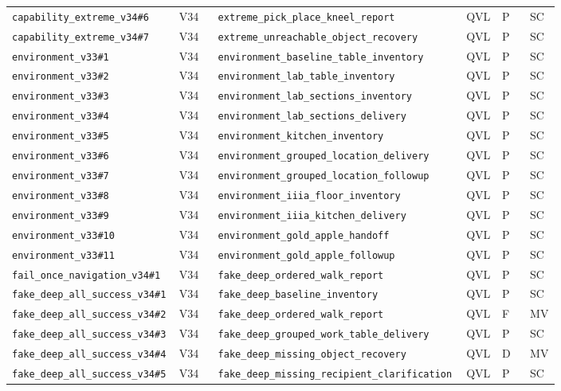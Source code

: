 \begin{landscape}
\begin{longtable}{@{}p{0.205\linewidth}p{0.075\linewidth}p{0.35\linewidth}p{0.06\linewidth}p{0.055\linewidth}p{0.055\linewidth}@{}}
\nolinkurl{capability_extreme_v34#6} & V34 & \nolinkurl{extreme_pick_place_kneel_report} & QVL & P & SC\\
\nolinkurl{capability_extreme_v34#7} & V34 & \nolinkurl{extreme_unreachable_object_recovery} & QVL & P & SC\\
\nolinkurl{environment_v33#1} & V34 & \nolinkurl{environment_baseline_table_inventory} & QVL & P & SC\\
\nolinkurl{environment_v33#2} & V34 & \nolinkurl{environment_lab_table_inventory} & QVL & P & SC\\
\nolinkurl{environment_v33#3} & V34 & \nolinkurl{environment_lab_sections_inventory} & QVL & P & SC\\
\nolinkurl{environment_v33#4} & V34 & \nolinkurl{environment_lab_sections_delivery} & QVL & P & SC\\
\nolinkurl{environment_v33#5} & V34 & \nolinkurl{environment_kitchen_inventory} & QVL & P & SC\\
\nolinkurl{environment_v33#6} & V34 & \nolinkurl{environment_grouped_location_delivery} & QVL & P & SC\\
\nolinkurl{environment_v33#7} & V34 & \nolinkurl{environment_grouped_location_followup} & QVL & P & SC\\
\nolinkurl{environment_v33#8} & V34 & \nolinkurl{environment_iiia_floor_inventory} & QVL & P & SC\\
\nolinkurl{environment_v33#9} & V34 & \nolinkurl{environment_iiia_kitchen_delivery} & QVL & P & SC\\
\nolinkurl{environment_v33#10} & V34 & \nolinkurl{environment_gold_apple_handoff} & QVL & P & SC\\
\nolinkurl{environment_v33#11} & V34 & \nolinkurl{environment_gold_apple_followup} & QVL & P & SC\\
\nolinkurl{fail_once_navigation_v34#1} & V34 & \nolinkurl{fake_deep_ordered_walk_report} & QVL & P & SC\\
\nolinkurl{fake_deep_all_success_v34#1} & V34 & \nolinkurl{fake_deep_baseline_inventory} & QVL & P & SC\\
\nolinkurl{fake_deep_all_success_v34#2} & V34 & \nolinkurl{fake_deep_ordered_walk_report} & QVL & F & MV\\
\nolinkurl{fake_deep_all_success_v34#3} & V34 & \nolinkurl{fake_deep_grouped_work_table_delivery} & QVL & P & SC\\
\nolinkurl{fake_deep_all_success_v34#4} & V34 & \nolinkurl{fake_deep_missing_object_recovery} & QVL & D & MV\\
\nolinkurl{fake_deep_all_success_v34#5} & V34 & \nolinkurl{fake_deep_missing_recipient_clarification} & QVL & P & SC\\

\end{longtable}
\end{landscape}
